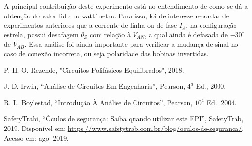 \documentclass[a4paper,12pt,oneside,openany,table,xcdraw]{article}
\begin{document}
A principal contribuição deste experimento está no entendimento de como se dá a obtenção do valor lido no wattímetro. Para isso, foi de interesse recordar de experimentos anteriores que a corrente de linha ou de fase $I_A$, na configuração estrela, possui desafagem $\theta_Z$ com relação à $V_{AN}$, a qual ainda é defasada de $-30^\circ$ de $V_{AB}$. Essa análise foi ainda importante para verificar a mudança de sinal no caso de conexão incorreta, ou seja polaridade das bobinas invertidas.


\newpage
\begin{thebibliography}{9} 
    P. H. O. Rezende,
    "Circuitos Polifásicos Equilibrados", 2018.

    J. D. Irwin,
    “Análise de Circuitos Em Engenharia”, Pearson, $4^a$ Ed., 2000.

    R. L. Boylestad,
    “Introdução À Análise de Circuitos”, Pearson, $10^a$ Ed., 2004.

    SafetyTrabi,
    “Óculos de segurança: Saiba quando utilizar este EPI”, SafetyTrab, 2019.
 Disponível em:
 \url{https://www.safetytrab.com.br/blog/oculos-de-seguranca/}. Acesso em: ago. 2019.


\end{thebibliography}
\end{document}
